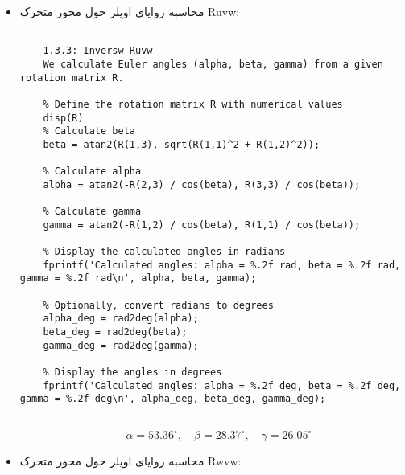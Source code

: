 \begin{enumerate}
\begin{itemize}
\begin{latin}
\begin{lstlisting}[frame=single,style=Matlab-Pyglike]
% Display the calculated angles in radians
fprintf('Calculated angles: alpha = %.2f rad, beta = %.2f rad, gamma = %.2f rad\n', alpha, beta, gamma);

% Optionally, convert radians to degrees
alpha_deg = rad2deg(alpha);
beta_deg = rad2deg(beta);
gamma_deg = rad2deg(gamma);

% Display the angles in degrees
fprintf('Calculated angles: alpha = %.2f deg, beta = %.2f deg, gamma = %.2f deg\n', alpha_deg, beta_deg, gamma_deg);
		
	\end{lstlisting}
\end{latin}

\[
\quad \alpha = 58.16^{\circ},
\quad \beta = -5.61^{\circ},
\quad \gamma = +37.41^{\circ}
\]


\item 
محاسبه زوایای اویلر حول محور متحرک Ruvw:
\begin{latin}
	\begin{lstlisting}[frame=single,style=Matlab-Pyglike]
		
	1.3.3: Inversw Ruvw 
	We calculate Euler angles (alpha, beta, gamma) from a given rotation matrix R.
	
	% Define the rotation matrix R with numerical values
	disp(R)
	% Calculate beta
	beta = atan2(R(1,3), sqrt(R(1,1)^2 + R(1,2)^2));
	
	% Calculate alpha
	alpha = atan2(-R(2,3) / cos(beta), R(3,3) / cos(beta));
	
	% Calculate gamma
	gamma = atan2(-R(1,2) / cos(beta), R(1,1) / cos(beta));
	
	% Display the calculated angles in radians
	fprintf('Calculated angles: alpha = %.2f rad, beta = %.2f rad, gamma = %.2f rad\n', alpha, beta, gamma);
	
	% Optionally, convert radians to degrees
	alpha_deg = rad2deg(alpha);
	beta_deg = rad2deg(beta);
	gamma_deg = rad2deg(gamma);
	
	% Display the angles in degrees
	fprintf('Calculated angles: alpha = %.2f deg, beta = %.2f deg, gamma = %.2f deg\n', alpha_deg, beta_deg, gamma_deg);
		
	\end{lstlisting}
\end{latin}

\[
\quad \alpha = 53.36^{\circ},
\quad \beta = 28.37^{\circ},
\quad \gamma = 26.05^{\circ}
\]


\item 
محاسبه زوایای اویلر حول محور متحرک Rwvw:
\begin{latin}
	\begin{lstlisting}[frame=single,style=Matlab-Pyglike]
		

\end{lstlisting}
\end{latin}
\end{itemize}
\end{enumerate}
